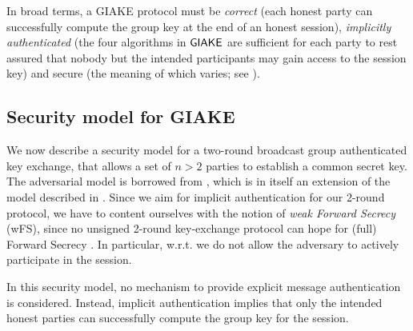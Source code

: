 	In broad terms, a GIAKE protocol must be \textit{correct} (each honest party can successfully compute the group key at the end of an honest session), \textit{implicitly authenticated} (the four algorithms in ${\mathsf{GIAKE}}$ are sufficient for each party to rest assured that nobody but the intended participants may gain access to the session key) and secure (the meaning of which varies; see ).

\subsection{Security model for GIAKE}\label{subsec:secmodel}
We now describe a security model for a two-round broadcast group authenticated key exchange, that allows a set of $n > 2$ parties to establish a common secret key.
The adversarial model is borrowed from \cite[Section 6.1]{JC:PanQiaRin22}, which is in itself an extension of the model described in \cite{EC:JKRS21}.
Since we aim for implicit authentication for our 2-round protocol, we have to content ourselves with the notion of \textit{weak Forward Secrecy} (wFS), since no unsigned 2-round key-exchange protocol can hope for (full) Forward Secrecy \cite[Section 3.2]{C:Krawczyk05}.
In particular, w.r.t. \cite[Section 6.1]{JC:PanQiaRin22} we do not allow the adversary to actively participate in the session.

In this security model, no mechanism to provide explicit message authentication is considered.
Instead, implicit authentication implies that only the intended honest parties can successfully compute the group key for the session.

